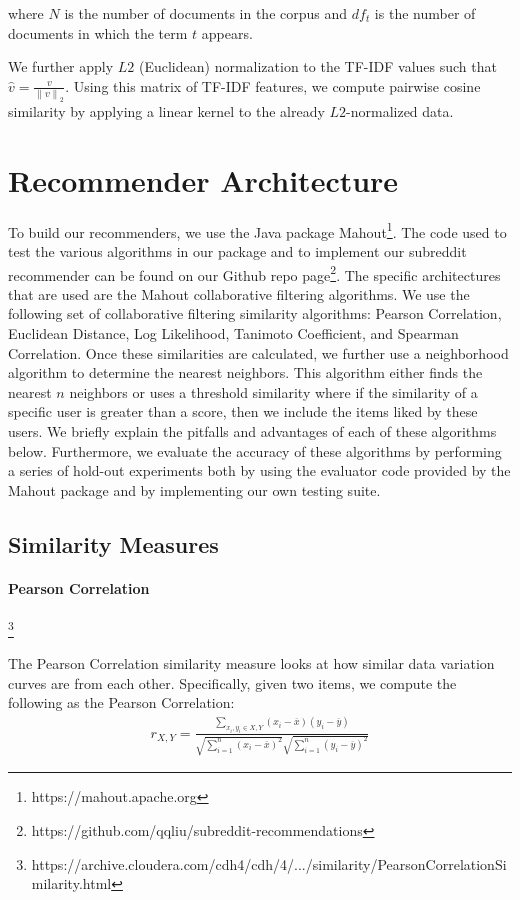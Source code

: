 \documentclass{article}
\begin{document}
where $N$ is the number of documents in the corpus and $df_t$ is the number of documents in which the term $t$ appears.

We further apply $L2$ (Euclidean) normalization to the TF-IDF values such that $\hat{v} = \frac{v}{{\lVert{v}\lVert}_2}$.  Using this matrix of TF-IDF features, we compute pairwise cosine similarity by applying a linear kernel to the already $L2$-normalized data.


\section{Recommender Architecture}\label{sec:rec-arch}

To build our recommenders, we use the Java package Mahout\footnote{https://mahout.apache.org}. The code
used to test the various algorithms in our package and to implement
our subreddit recommender can be found on our Github repo page\footnote{https://github.com/qqliu/subreddit-recommendations}. The specific 
architectures that are used are the Mahout collaborative filtering algorithms. 
We use the following set of collaborative filtering similarity algorithms: 
Pearson Correlation, Euclidean Distance, Log Likelihood, Tanimoto Coefficient, and Spearman Correlation. 
Once these similarities are calculated, we further use a neighborhood algorithm to 
determine the nearest neighbors. This algorithm either finds the nearest
$n$ neighbors or uses a threshold similarity where if the similarity of a specific user is
greater than a score, then we include the items liked by these
users. We briefly explain
the pitfalls and advantages of each of these algorithms below. Furthermore, we evaluate the 
accuracy of these algorithms by performing a series of hold-out experiments both by using the 
evaluator code provided by the Mahout package and by implementing our own testing suite.

\subsection{Similarity Measures}

\paragraph{Pearson Correlation}\footnote{https://archive.cloudera.com/cdh4/cdh/4/.../similarity/PearsonCorrelationSimilarity.html}

The Pearson Correlation similarity measure looks at how similar data variation curves are from each other. 
Specifically, given two items, we compute the following as the Pearson Correlation: \begin{align*}
r_{X, Y} = \frac{\sum_{x_i, y_i \in X, Y} (x_i - \overline{x})(y_i - \overline{y})}{\sqrt{\sum_{i = 1}^n (x_i - \overline{x})^2}\sqrt{\sum_{i=1}^n (y_i - \overline{y})^2}}
\end{align*}
\end{document}
